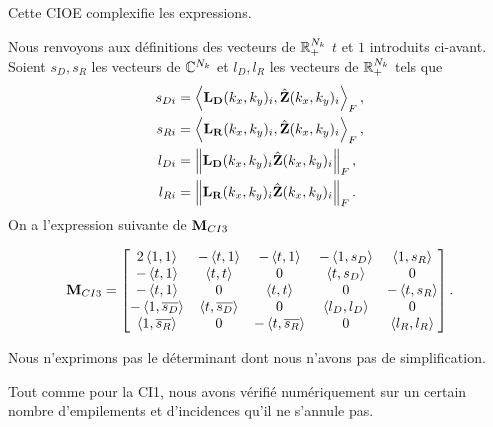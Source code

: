         Cette CIOE complexifie les expressions.


        Nous renvoyons aux définitions des vecteurs de \(\mathbb R_+^{N_{k}}\) \(t\) et \(1\) introduits ci-avant.
        Soient \(s_D,s_R\) les vecteurs de \(\mathbb C^{N_{k}}\) et \(l_D,l_R\) les vecteurs de \(\mathbb R_+^{N_{k}}\) tels que
        \begin{align*}
          s_{Di} &= \left<{\mathbf{L_D}(k_{x},k_{y})_i},{\hat{\mathbf{Z}}(k_{x},k_{y})_i}\right>_F,
          \\
          s_{Ri} &= \left<{\mathbf{L_R}(k_{x},k_{y})_i},{\hat{\mathbf{Z}}(k_{x},k_{y})_i}\right>_F,
          \\
          l_{Di} &= \left\lVert\mathbf{L_D}(k_{x},k_{y})_i\hat{\mathbf{Z}}(k_{x},k_{y})_i\right\rVert_F,
          \\
          l_{Ri} &= \left\lVert\mathbf{L_R}(k_{x},k_{y})_i\hat{\mathbf{Z}}(k_{x},k_{y})_i\right\rVert_F.
        \end{align*}
        On a l'expression suivante de \({\mathbf{M}_{CI3}}\)

        \begin{equation*}
          {\mathbf{M}}_{CI3} = \begin{bmatrix}
          2\left<{1},{1}\right>          & -\left<{t},{1}\right>          & -\left<{t},{1}\right>           & -\left<{1},{s_D}\right>   & \left<{1},{s_R}\right>
          \\
          -\left<{t},{1}\right>          & \left<{t},{t}\right>           & 0                    & \left<{t},{s_D}\right>    & 0
          \\
          -\left<{t},{1}\right>          & 0                   & \left<{t},{t}\right>            & 0              & - \left<{t},{s_R}\right>
          \\
          -\left<{1},{{\overline{s_D}}}\right> & \left<{t},{{\overline{s_D}}}\right>  & 0                    & \left<{l_D},{l_D}\right>  & 0
          \\
          \left<{1},{{\overline{s_R}}}\right>  & 0                   & -\left<{t},{{\overline{s_R}}}\right>  & 0              & \left<{l_R},{l_R}\right>
          \end{bmatrix}.
        \end{equation*}
        
        Nous n'exprimons pas le déterminant dont nous n'avons pas de simplification.

        Tout comme pour la CI1, nous avons vérifié numériquement sur un certain nombre d'empilements et d’incidences qu'il ne s'annule pas.


